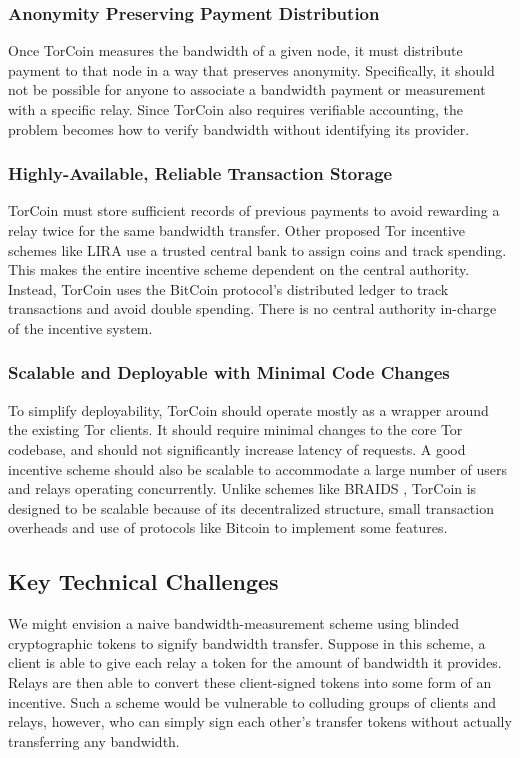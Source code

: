 \subsubsection{Anonymity Preserving Payment Distribution} Once TorCoin
measures the bandwidth of a given node, it must distribute payment to that
node in a way that preserves anonymity. Specifically, it should not be
possible for anyone to associate a bandwidth payment or measurement with a
specific relay. Since TorCoin also requires verifiable accounting, the problem
becomes how to verify bandwidth without identifying its provider.

\subsubsection{Highly-Available, Reliable Transaction Storage} TorCoin must
store sufficient records of previous payments to avoid rewarding a relay twice
for the same bandwidth transfer. Other proposed Tor incentive schemes
like LIRA\cite{jansen2013lira} use a trusted central bank to assign coins and
track spending. This makes the entire incentive scheme dependent on the
central authority. Instead, TorCoin uses the BitCoin protocol's distributed
ledger to track transactions and avoid double spending\cite{karame2012two}.
There is no central authority in-charge of the incentive system.

\subsubsection{Scalable and Deployable with Minimal Code Changes} To simplify
deployability, TorCoin should operate mostly as a wrapper around the existing
Tor clients. It should require minimal changes to the core Tor codebase, and
should not significantly increase latency of requests. A good incentive scheme
should also be scalable to accommodate a large number of users and relays
operating concurrently. Unlike schemes like BRAIDS \cite{ccs10-braids},
TorCoin is designed to be scalable because of its decentralized structure,
small transaction overheads and use of protocols like Bitcoin to
implement some features.

\subsection{Key Technical Challenges}

We might envision a naive bandwidth-measurement
scheme using blinded cryptographic tokens to signify bandwidth
transfer. Suppose in this scheme, a client is able to give each relay a token
for the amount of bandwidth it provides. Relays are then able to convert these
client-signed tokens into some form of an incentive. 
Such a scheme would be vulnerable
to colluding groups of clients and relays, however,
who can simply sign each other's
transfer tokens without actually transferring any bandwidth.

